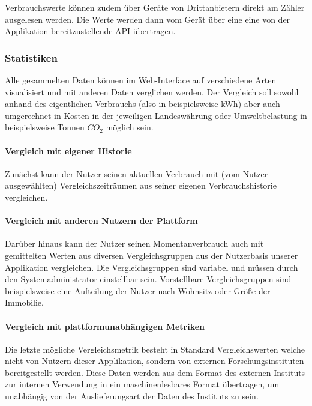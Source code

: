 Verbrauchswerte können zudem über Geräte von Drittanbietern direkt am Zähler ausgelesen werden. Die Werte werden dann vom Gerät über eine eine von der Applikation bereitzustellende API übertragen.

\subsubsection{Statistiken}

Alle gesammelten Daten können im Web-Interface auf verschiedene Arten visualisiert und mit anderen Daten verglichen werden. Der Vergleich soll sowohl anhand des eigentlichen Verbrauchs (also in beispielsweise kWh) aber auch umgerechnet in Kosten in der jeweiligen Landeswährung oder Umweltbelastung in beispielsweise Tonnen $CO_2$ möglich sein.

\paragraph{Vergleich mit eigener Historie}

Zunächst kann der Nutzer seinen aktuellen Verbrauch  mit (vom Nutzer ausgewählten) Vergleichszeiträumen aus seiner eigenen Verbrauchshistorie vergleichen. %


\paragraph{Vergleich mit anderen Nutzern der Plattform}
Darüber hinaus kann der Nutzer seinen Momentanverbrauch auch mit gemittelten Werten aus diversen Vergleichsgruppen aus der Nutzerbasis unserer Applikation vergleichen. Die Vergleichsgruppen sind variabel und müssen durch den Systemadministrator einstellbar sein. Vorstellbare Vergleichsgruppen sind beispielsweise eine Aufteilung der Nutzer nach Wohnsitz oder Größe der Immobilie. %


\paragraph{Vergleich mit plattformunabhängigen Metriken}
\label{vgl_plattformunabhängig}

Die letzte mögliche Vergleichsmetrik besteht in Standard Vergleichswerten welche nicht von Nutzern dieser Applikation, sondern von externen Forschungsinstituten bereitgestellt werden. Diese Daten werden aus dem Format des externen Instituts zur internen Verwendung in ein maschinenlesbares Format übertragen, um unabhängig von der Auslieferungsart der Daten des Instituts zu sein. %


